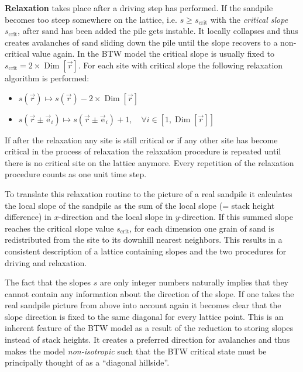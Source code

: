 \textbf{Relaxation} takes place after a driving step has performed. If the sandpile becomes too steep somewhere on the
lattice, i.e. $s \geq s_{\mathrm{crit}}$ with the \emph{critical slope} $s_{\mathrm{crit}}$, after sand has been added
the pile gets instable. It locally collapses and thus creates avalanches of sand sliding down the pile until the slope
recovers to a non-critical value again. In the BTW model the critical slope is usually fixed to
$s_{\mathrm{crit}}=2\times\operatorname{Dim}\left[\vec{r}\right]$. For each site with critical slope the following
relaxation algorithm is performed:
\begin{itemize}
\item $s(\vec{r}) \mapsto s(\vec{r}) - 2\times\operatorname{Dim}\left[\vec{r}\right]$
\item $s(\vec{r}\pm\vec{\mathrm{e}}_i) \mapsto s(\vec{r}\pm\vec{\mathrm{e}}_i) + 1,
\quad \forall i\in[1,\operatorname{Dim}\left[\vec{r}\right]]$
\end{itemize}
If after the relaxation any site is still critical or if any other site has become critical in the process of
relaxation the relaxation procedure is repeated until there is no critical site on the lattice anymore.
Every repetition of the relaxation procedure counts as one unit time step.

To translate this relaxation routine to the picture of a real sandpile it calculates the local slope of the sandpile as
the sum of the local slope (= stack height difference) in $x$-direction and the local slope in $y$-direction.
If this summed slope reaches the critical slope value $s_{\mathrm{crit}}$, for each dimension one grain of sand is
redistributed from the site to its downhill nearest neighbors. This results in a consistent description of a lattice
containing slopes and the two procedures for driving and relaxation.

The fact that the slopes $s$ are only integer numbers naturally implies that they cannot contain any information about
the direction of the slope. If one takes the real sandpile picture from above into account again it becomes clear that
the slope direction is fixed to the same diagonal for every lattice point. This is an inherent feature of the BTW model
as a result of the reduction to storing slopes instead of stack heights. It creates a preferred direction for avalanches
and thus makes the model \emph{non-isotropic} such that the BTW critical state must be principally thought of as a
\enquote{diagonal hillside}.

